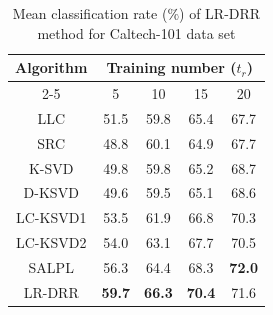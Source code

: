 \begin{table}
\small
\caption{Mean classification rate ($\%$) of LR-DRR method for Caltech-101 data set}
\label{table: LRDRR_Accuracy_Caltech}
\centering
\begin{tabular}{|c|c|c|c|c|}
\hline
\multirow{2}{*}{Algorithm} & \multicolumn{4}{c|}{Training number ($t_r$)}\\
\cline{2-5}
 & 5              & 10             & 15             & 20\\
\hline            
LLC \cite{LLC} & 51.5           & 59.8          & 65.4          & 67.7\\
\hline
SRC \cite{SRC} & 48.8           & 60.1           & 64.9           & 67.7\\
\hline
K-SVD \cite{KSVD} & 49.8           & 59.8           & 65.2           & 68.7\\
\hline
D-KSVD \cite{DKSVD} & 49.6           & 59.5           & 65.1           & 68.6\\
\hline
LC-KSVD1 \cite{LCKSVD} & 53.5      & 61.9           & 66.8           & 70.3\\
\hline
LC-KSVD2 \cite{LCKSVD} & 54.0           & 63.1           & 67.7           & 70.5\\
\hline
SALPL \cite{SALPL} & 56.3           & 64.4           & 68.3           & \textbf{72.0}\\
\hline
LR-DRR & \textbf{59.7} & \textbf{66.3} & \textbf{70.4} & 71.6\\ 
\hline
\end{tabular}
\end{table}
%
